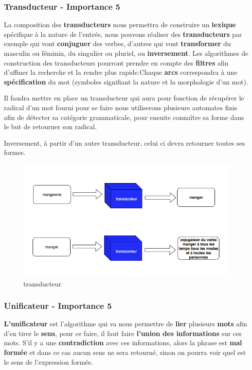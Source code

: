 \subsubsection{Transducteur - Importance 5}


La composition des \textbf{transducteurs} nous permettra de construire un \textbf{lexique} spécifique à la nature de l'entrée, nous pouvons réaliser des \textbf{transducteurs} par exemple qui vont \textbf{conjuguer} des verbes, d'autres qui vont \textbf{transformer} du masculin ou féminin, du singulier ou pluriel, ou \textbf{inversement}. Les algorithmes de construction des transducteurs pourront prendre en compte des \textbf{filtres} afin d'affiner la recherche et la rendre plus rapide.Chaque \textbf{arcs} correspondra à une \textbf{spécification} du mot (symboles signifiant la nature et la morphologie d'un mot).



{Il faudra mettre en place un transducteur qui aura pour fonction de récupérer le radical d'un mot fourni pour se faire nous utiliserons plusieurs automates finis afin de détecter sa catégorie grammaticale, pour ensuite connaître sa forme dans le but de retourner son radical.}

{Inversement, à partir d'un autre transducteur, celui ci devra retourner toutes ses formes.}

\begin{figure}[ht]
    \centering
    \includegraphics[scale=0.5]{transducteur.png}
    \caption{transducteur }
\end{figure}

\subsubsection{Unificateur - Importance 5}{
\textbf{L'unificateur} est l'algorithme qui va nous permettre de \textbf{lier} plusieurs \textbf{mots} afin d'en tirer le \textbf{sens}, pour ce faire, il faut faire \textbf{l'union des informations} sur ces mots. S'il y a une \textbf{contradiction} avec ces informations, alors la phrase est \textbf{mal formée} et dans ce cas aucun sens ne sera retourné, sinon on pourra voir quel est le sens de l'expression formée.\par}

